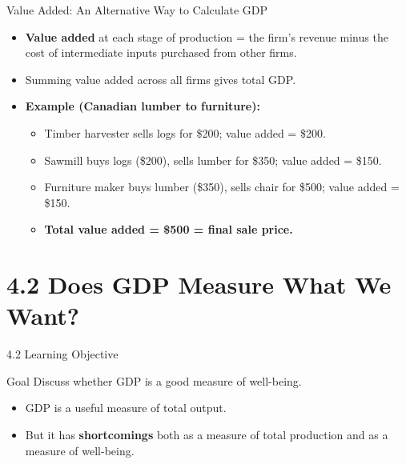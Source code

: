 \documentclass[aspectratio=169]{beamer}
\begin{document}
\begin{frame}{Value Added: An Alternative Way to Calculate GDP}
\transfade
\begin{itemize}[<+->]
  \item \textbf{Value added} at each stage of production = the firm's revenue minus the cost of intermediate inputs purchased from other firms.
  \item Summing value added across all firms gives total GDP.
  \item \textbf{Example (Canadian lumber to furniture):}
  \begin{itemize}[<+->]
    \item Timber harvester sells logs for \$200; value added = \$200.
    \item Sawmill buys logs (\$200), sells lumber for \$350; value added = \$150.
    \item Furniture maker buys lumber (\$350), sells chair for \$500; value added = \$150.
    \item \textbf{Total value added = \$500 = final sale price.}
  \end{itemize}
\end{itemize}
\end{frame}

\section{4.2 Does GDP Measure What We Want?}

\begin{frame}{4.2 Learning Objective}
\transfade
\begin{block}{Goal}
Discuss whether GDP is a good measure of well-being.
\end{block}
\begin{itemize}[<+->]
  \item GDP is a useful measure of total output.
  \item But it has \textbf{shortcomings} both as a measure of total production and as a measure of well-being.
\end{itemize}
\end{frame}
\end{document}

